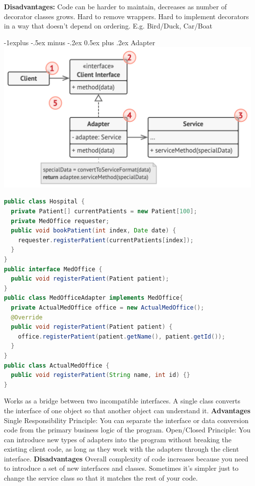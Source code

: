 \documentclass[letterpaper, 8pt]{extarticle}
\makeatletter
\renewcommand{\subsection}{\@startsection{subsection}{2}{0mm}%
                                {-1explus -.5ex minus -.2ex}%
                                {0.5ex plus .2ex}%
                                {\normalfont\small\bfseries}}
\makeatother
\begin{document}
\begin{multicols*}{5}
  \textbf{Disadvantages:}
  Code can be harder to maintain, decreases as number of decorator classes grows.
  Hard to remove wrappers.
  Hard to implement decorators in a way that doesn't depend on ordering. E.g. Bird/Duck, Car/Boat

  \subsection{Adapter}
  \includegraphics[width=\linewidth]{adapter.png}
  \begin{lstlisting}[language=Java, breaklines=true]
public class Hospital {
  private Patient[] currentPatients = new Patient[100];
  private MedOffice requester;
  public void bookPatient(int index, Date date) {
    requester.registerPatient(currentPatients[index]);
  } 
}
public interface MedOffice {
  public void registerPatient(Patient patient);
}
public class MedOfficeAdapter implements MedOffice{
  private ActualMedOffice office = new ActualMedOffice();
  @Override
  public void registerPatient(Patient patient) {
    office.registerPatient(patient.getName(), patient.getId());
  }
}
public class ActualMedOffice {
  public void registerPatient(String name, int id) {} 
}
  \end{lstlisting}
  Works as a bridge between two incompatible interfaces. A single class converts the interface of one object so that another object can understand it.
  \textbf{Advantages} Single Responsibility Principle: You can separate the interface or data conversion code from the primary business logic of the program. Open/Closed Principle: You can introduce new types of adapters into the program without breaking the existing client code, as long as they work with the adapters through the client interface.
  \textbf{Disadvantages} Overall complexity of code increases because you need to introduce a set of new interfaces and classes. Sometimes it’s simpler just to change the service class so that it matches the rest of your code.


\end{multicols*}
\end{document}
